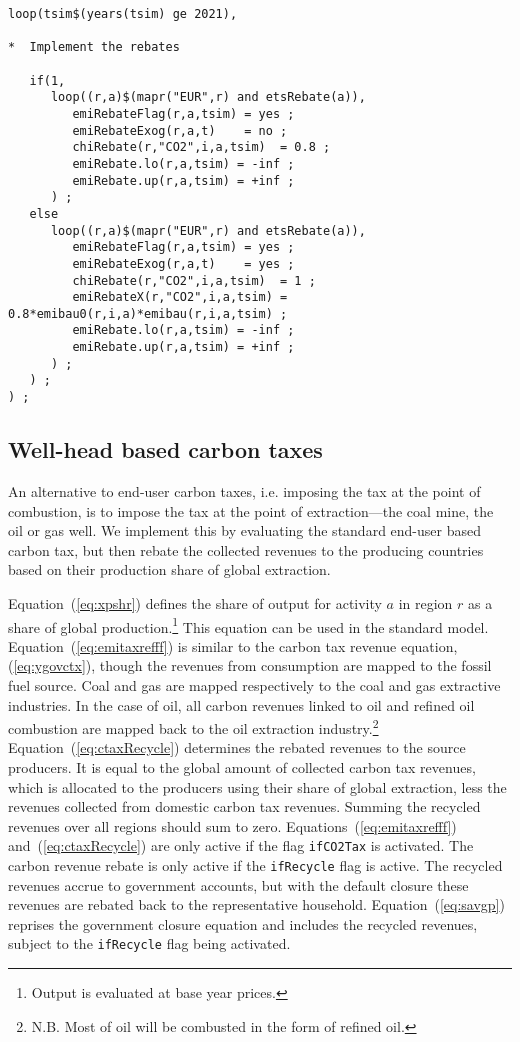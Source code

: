 \documentclass[11pt,letterpaper]{report}
\begin{document}
\begin{lstlisting}[language=GAMS,
	caption={Implementing emission rights}, label=lst:EmiRebate]
loop(tsim$(years(tsim) ge 2021),

*  Implement the rebates

   if(1,
      loop((r,a)$(mapr("EUR",r) and etsRebate(a)),
         emiRebateFlag(r,a,tsim) = yes ;
         emiRebateExog(r,a,t)    = no ;
         chiRebate(r,"CO2",i,a,tsim)  = 0.8 ;
         emiRebate.lo(r,a,tsim) = -inf ;
         emiRebate.up(r,a,tsim) = +inf ;
      ) ;
   else
      loop((r,a)$(mapr("EUR",r) and etsRebate(a)),
         emiRebateFlag(r,a,tsim) = yes ;
         emiRebateExog(r,a,t)    = yes ;
         chiRebate(r,"CO2",i,a,tsim)  = 1 ;
         emiRebateX(r,"CO2",i,a,tsim) = 0.8*emibau0(r,i,a)*emibau(r,i,a,tsim) ;
         emiRebate.lo(r,a,tsim) = -inf ;
         emiRebate.up(r,a,tsim) = +inf ;
      ) ;
   ) ;
) ;

\end{lstlisting}


\subsection{Well-head based carbon taxes}

An alternative to end-user carbon taxes, i.e. imposing the tax
at the point of combustion, is to impose the tax at the point
of extraction---the coal mine, the oil or gas well. We implement this
by evaluating the standard end-user based carbon tax, but then
rebate the collected revenues to the producing countries based
on their production share of global extraction.

Equation~(\ref{eq:xpshr}) defines the share of output for
activity $a$ in region $r$ as a share of global production.\footnote{Output
is evaluated at base year prices.} This equation can be used in the
standard model.
Equation~(\ref{eq:emitaxrefff}) is similar to the carbon tax revenue equation, (\ref{eq:ygovctx}), though the revenues from consumption
are mapped to the fossil fuel source. Coal and gas are mapped
respectively to the coal and gas extractive industries. In the case
of oil, all carbon revenues linked to oil and refined oil combustion
are mapped back to the oil extraction industry.\footnote{N.B. Most of
oil will be combusted in the form of refined oil.}
Equation~(\ref{eq:ctaxRecycle}) determines the rebated revenues to
the source producers. It is equal to the global amount of collected
carbon tax revenues, which is allocated to the producers using
their share of global extraction, less the revenues collected from
domestic carbon tax revenues. Summing the recycled revenues
over all regions should sum to zero. Equations~(\ref{eq:emitaxrefff})
and~(\ref{eq:ctaxRecycle}) are only active if the flag \texttt{ifCO2Tax}
is activated. The carbon revenue rebate is only active if the
\texttt{ifRecycle} flag is active. The recycled revenues accrue
to government accounts, but with the default closure these revenues
are rebated back to the representative household.
Equation~(\ref{eq:savgp}) reprises the government closure equation
and includes the recycled revenues, subject to the \texttt{ifRecycle}
flag being activated.
\end{document}
